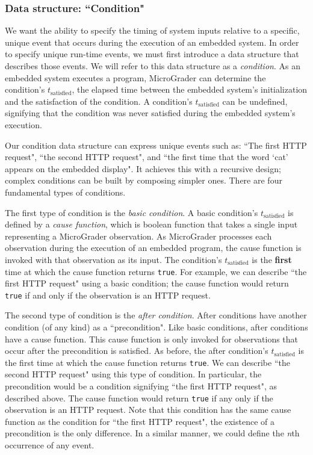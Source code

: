 \documentclass[12pt]{article}
\begin{document}
\subsubsection{Data structure: ``Condition"}
\label{sec:condition}
We want the ability to specify the timing of system inputs relative to a specific, unique event that occurs during the execution of an embedded system.  In order to specify unique run-time events, we must first introduce a data structure that describes those events.  We will refer to this data structure as a \textit{condition}.  As an embedded system executes a program, MicroGrader can determine the condition's $t_{\text{satisfied}}$, the elapsed time between the embedded system's initialization and the satisfaction of the condition.  A condition's $t_{\text{satisfied}}$ can be undefined, signifying that the condition was never satisfied during the embedded system's execution.

Our condition data structure can express unique events such as: ``The first HTTP request", ``the second HTTP request", and ``the first time that the word `cat' appears on the embedded display".  It achieves this with a recursive design; complex conditions can be built by composing simpler ones.  There are four fundamental types of conditions.

The first type of condition is the \textit{basic condition}.  A basic condition's $t_{\text{satisfied}}$ is defined by a \textit{cause function}, which is boolean function that takes a single input representing a MicroGrader observation.  As MicroGrader processes each observation during the execution of an embedded program, the cause function is invoked with that observation as its input.  The condition's $t_{\text{satisfied}}$ is the \textbf{first} time at which the cause function returns \texttt{true}.  For example, we can describe ``the first HTTP request" using a basic condition; the cause function would return \texttt{true} if and only if the observation is an HTTP request.

The second type of condition is the \textit{after condition}.  After conditions have another condition (of any kind) as a ``precondition".  Like basic conditions, after conditions have a cause function.  This cause function is only invoked for observations that occur after the precondition is satisfied.  As before, the after condition's $t_{\text{satisfied}}$ is the first time at which the cause function returns \texttt{true}.  We can describe ``the second HTTP request" using this type of condition.  In particular, the precondition would be a condition signifying ``the first HTTP request", as described above.  The cause function would return \texttt{true} if any only if the observation is an HTTP request.  Note that this condition has the same cause function as the condition for ``the first HTTP request", the existence of a precondition is the only difference.  In a similar manner, we could define the \textit{n}th occurrence of any event.
\end{document}
